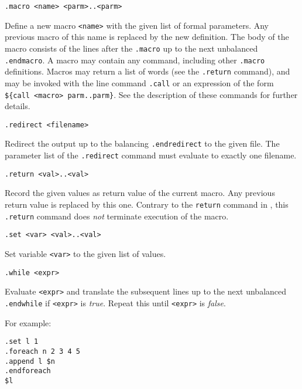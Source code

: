 \begin{verbatim}
.macro <name> <parm>..<parm>
\end{verbatim}
\begin{desc}
Define a new macro \verb+<name>+ with the given list of formal parameters.
Any previous macro of this name is replaced by the new definition.
The body of the macro consists of the lines after the
\verb+.macro+ up to the next unbalanced \verb+.endmacro+.
A macro may contain any {\Tm} command, including other \verb+.macro+
definitions.
Macros may return a list of words (see the \verb+.return+ command),
and may be invoked with the line command \verb+.call+ or an expression
of the form \verb+${call <macro> parm..parm}+.
See the description of these commands for further details.
\end{desc}
\begin{verbatim}
.redirect <filename>
\end{verbatim}
\begin{desc}
Redirect the output up to the balancing \verb'.endredirect' to the given
file.
The parameter list of the \verb'.redirect' command must evaluate to
exactly one filename.
\end{desc}
\begin{verbatim}
.return <val>..<val>
\end{verbatim}
\begin{desc}
Record the given values as return value of the current macro.
Any previous return value is replaced by this one.
Contrary to the {\tt return} command in {\C}, this \verb+.return+
command does {\em not} \/terminate execution of the macro.
\end{desc}
\begin{verbatim}
.set <var> <val>..<val>
\end{verbatim}
\begin{desc}
Set variable {\tt <var>} to the given list of values.
\end{desc}
\begin{verbatim}
.while <expr>
\end{verbatim}
\begin{desc}
Evaluate {\tt <expr>} and translate the subsequent lines up to the next
unbalanced {\tt .endwhile} if {\tt <expr>} is {\it true}.
Repeat this until {\tt <expr>} is {\it false}.
\end{desc}
For example:
\begin{verbatim}
.set l 1
.foreach n 2 3 4 5
.append l $n
.endforeach
$l
\end{verbatim}
